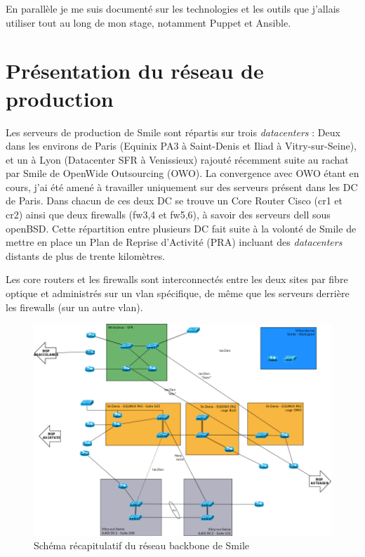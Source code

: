 \documentclass[14 pt]{extreport}
\begin{document}
En parallèle je me suis documenté sur les technologies et les outils que j'allais utiliser tout au long de mon stage, notamment Puppet et Ansible.

\section{Présentation du réseau de production}

Les serveurs de production de Smile sont répartis sur trois \emph{datacenters} : Deux dans les environs de Paris (Equinix PA3 à Saint-Denis et Iliad à Vitry-sur-Seine), et un à Lyon (Datacenter SFR à Venissieux) rajouté récemment suite au rachat par Smile de OpenWide Outsourcing (OWO). La convergence avec OWO étant en cours, j'ai été amené à travailler uniquement sur des serveurs présent dans les DC de Paris. Dans chacun de ces deux DC se trouve un Core Router Cisco (cr1 et cr2) ainsi que deux firewalls (fw3,4 et fw5,6), à savoir des serveurs dell sous openBSD. Cette répartition entre plusieurs DC fait suite à la volonté de Smile de mettre en place un Plan de Reprise d'Activité (PRA) incluant des \emph{datacenters} distants de plus de trente kilomètres.

Les core routers et les firewalls sont interconnectés entre les deux sites par fibre optique et administrés sur un vlan spécifique, de même que les serveurs derrière les firewalls (sur un autre vlan).

\begin{figure}[htp]
\centering
\includegraphics[scale=0.4]{reseau_backbone.png}
\caption{Schéma récapitulatif du réseau backbone de Smile}
\label{}
\end{figure}
\end{document}
